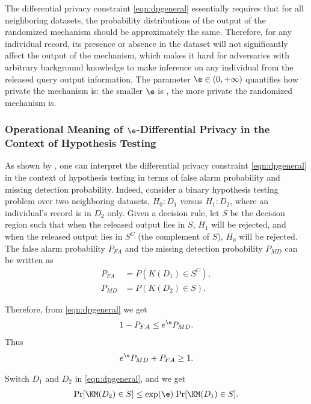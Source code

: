 The differential privacy constraint \eqref{eqn:dpgeneral} essentially requires that for all neighboring datasets, the probability distributions of the output of the randomized mechanism should be approximately the same. Therefore, for any individual record, its presence or absence in the dataset will not significantly affect the output of the mechanism, which makes it hard for adversaries with arbitrary background knowledge to make inference on any individual from the released query output information. The parameter $\e \in (0, +\infty)$ quantifies how private the mechanism is: the smaller $\e$ is , the more private the randomized mechanism is.






\subsubsection{Operational Meaning of $\e$-Differential Privacy in the Context of Hypothesis Testing}


As shown by \cite{Zhou08}, one can interpret the   differential privacy constraint  \eqref{eqn:dpgeneral} in the context of hypothesis testing in terms of false alarm probability and missing detection probability. Indeed, consider a binary hypothesis testing problem over two neighboring datasets, $H_0: D_1 $ versus $H_1: D_2$, where an individual's record is in $D_2$ only. Given a decision rule, let $S$ be the decision region such that when the released output lies in $S$, $H_1$ will be rejected, and when the released output lies in $S^C$ (the complement of $S$), $H_0$ will be rejected. The false alarm probability $P_{FA}$ and the missing detection probability $P_{MD}$ can be written as
\begin{align}
	P_{FA} &= P(K(D_1) \in S^C), \\
	P_{MD} &= P(K(D_2) \in S).
\end{align}

Therefore, from \eqref{eqn:dpgeneral} we get
\begin{align}
	1 - P_{FA} \le e^{\e} P_{MD} .
\end{align}
Thus
\begin{align}
	 e^{\e} P_{MD} + P_{FA} \ge 1 .
\end{align}

Switch $D_1$ and $D_2$ in \eqref{eqn:dpgeneral}, and we get
	\begin{align}
	 	\text{Pr}[\KM(D_2) \in S] \le \exp(\e) \;  \text{Pr}[\KM(D_1) \in S] .
	 \end{align}

